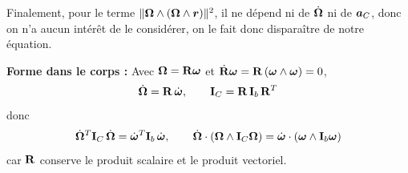 \begin{demonstration}
    Finalement, pour le terme
    $\|\bm{\Omega}\wedge(\bm{\Omega}\wedge\bm{r})\|^2$, il ne dépend
    ni de $\dot{\bm{\Omega}}$ ni de $\bm{a}_C$, donc on n'a aucun intérêt de le considérer, on le fait donc disparaître de notre équation.

    \textbf{Forme dans le corps : } Avec $\bm{\Omega} =
    \mathbf{R}\bm{\omega}$ et $\dot{\mathbf{R}}\bm{\omega} =
    \mathbf{R}\,(\bm{\omega}\wedge\bm{\omega}) = 0$,
    \[
        \dot{\bm{\Omega}} = \mathbf{R}\,\dot{\bm{\omega}},
        \qquad
        \mathbf{I}_C = \mathbf{R}\,\mathbf{I}_b\,\mathbf{R}^T
    \]
    donc
    \[
        \dot{\bm{\Omega}}^T\mathbf{I}_C\,\dot{\bm{\Omega}}
        = \dot{\bm{\omega}}^T\mathbf{I}_b\,\dot{\bm{\omega}},
        \qquad
        \dot{\bm{\Omega}}\cdot(\bm{\Omega}\wedge\mathbf{I}_C\bm{\Omega})
        = \dot{\bm{\omega}}\cdot(\bm{\omega}\wedge\mathbf{I}_b\bm{\omega})
    \]
    car $\mathbf{R}$ conserve le produit scalaire et le produit vectoriel.
\end{demonstration}